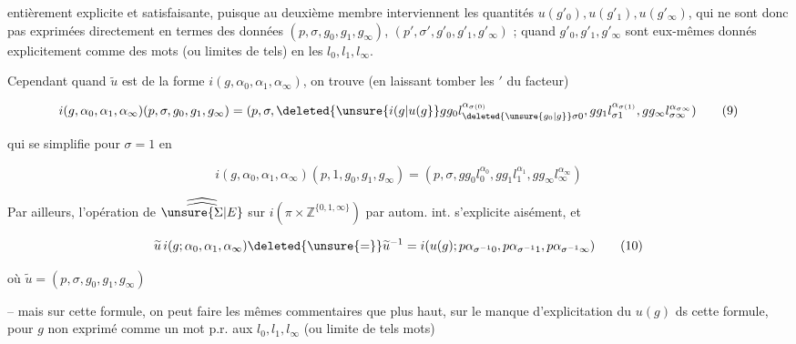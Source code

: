 
entièrement explicite et satisfaisante, puisque au deuxième membre interviennent les quantités $u(g'_0),u(g'_1),u(g'_\infty)$, qui ne sont donc pas exprimées directement en termes des  données $(p,\sigma,g_0,g_1,g_\infty)$, $(p',\sigma',g'_0,g'_1,g'_\infty)$ ;   quand $g'_0,g'_1,g'_\infty$ sont eux-mêmes donnés explicitement comme des mots (ou limites de tels) en les $l_0,l_1,l_\infty$.

Cependant quand $\widetilde u$ est de la forme $i(g,\alpha_0,\alpha_1,\alpha_\infty)$, on trouve (en laissant tomber les $'$ du  facteur)

\[
 i(g,\alpha_0,\alpha_1,\alpha_\infty)(p,\sigma,g_0,g_1,g_\infty)=(p,\sigma,\deleted{\unsure{i(g|u(g}}gg_0l_{\deleted{\unsure{g_0|g}}\sigma0}^{\alpha_{\sigma(0)}},gg_1l_{\sigma1}^{\alpha_{\sigma(1)}},gg_\infty l_{\sigma\infty}^{\alpha_{\sigma\infty}})\tag*{(9)}
\]

qui se simplifie pour $\sigma=1$ en

\[
 i(g,\alpha_0,\alpha_1,\alpha_\infty)(p,1,g_0,g_1,g_\infty)=(p,\sigma,gg_0l_0^{\alpha_0},gg_1l_1^{\alpha_1},gg_\infty l_\infty^{\alpha_\infty})\tag*{($9'$)}
\]

Par ailleurs, l'opération de $\widehat{\widehat{\unsure{\Sigma|E}}}$ sur $i(\pi\times\mathbb Z^{\{0,1,\infty\}})$ par autom. int. s'explicite aisément, et 

\[
 \widetilde u\,i(g;\alpha_0,\alpha_1,\alpha_\infty)\deleted{\unsure{=}}\widetilde u^{-1}=i(u(g);p\alpha_{\sigma^{-1}0},p\alpha_{\sigma^{-1}1},p\alpha_{\sigma^{-1}\infty})\tag*{(10)}
\]

où $\widetilde u=(p,\sigma,g_0,g_1,g_\infty)$

-- mais sur cette formule, on peut faire les mêmes commentaires que plus haut, sur le manque d'explicitation du  $u(g)$ ds cette formule, pour $g$ non exprimé comme un mot p.r. aux $l_0,l_1,l_\infty$ (ou limite de tels mots)

